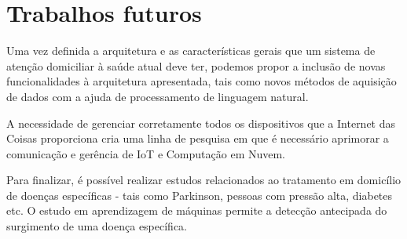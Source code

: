 \section{Trabalhos futuros} \label{sec:trabalhos-futuros}

Uma vez definida a arquitetura e as características gerais que um sistema de
atenção domiciliar à saúde atual deve ter, podemos propor a inclusão de
novas funcionalidades à arquitetura apresentada, tais como novos métodos
de aquisição de dados com a ajuda de processamento de linguagem natural.

A necessidade de gerenciar corretamente todos os dispositivos que a Internet
das Coisas proporciona cria uma linha de pesquisa em que é necessário aprimorar
a comunicação e gerência de IoT e Computação em Nuvem.

Para finalizar, é possível realizar estudos relacionados ao tratamento em domicílio de
doenças específicas - tais como Parkinson, pessoas com pressão alta,
diabetes etc. O estudo em aprendizagem de máquinas permite a detecção
antecipada do surgimento de uma doença específica.
